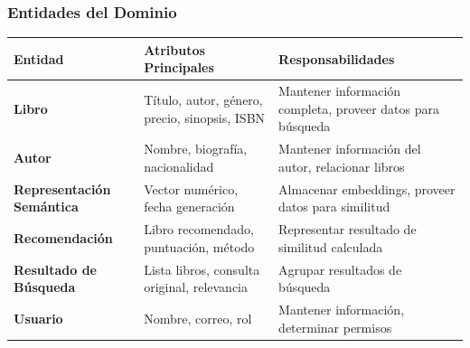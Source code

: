 \documentclass[aspectratio=169]{beamer}
\begin{document}
\begin{frame}
\frametitle{Entidades del Dominio}

\begin{table}
\centering
\tiny
\begin{tabular}{p{3cm}p{4cm}p{4cm}}
\toprule
\textbf{Entidad} & \textbf{Atributos Principales} & \textbf{Responsabilidades} \\
\midrule
\textbf{Libro} & Título, autor, género, precio, sinopsis, ISBN & Mantener información completa, proveer datos para búsqueda \\
\textbf{Autor} & Nombre, biografía, nacionalidad & Mantener información del autor, relacionar libros \\
\textbf{Representación Semántica} & Vector numérico, fecha generación & Almacenar embeddings, proveer datos para similitud \\
\textbf{Recomendación} & Libro recomendado, puntuación, método & Representar resultado de similitud calculada \\
\textbf{Resultado de Búsqueda} & Lista libros, consulta original, relevancia & Agrupar resultados de búsqueda \\
\textbf{Usuario} & Nombre, correo, rol & Mantener información, determinar permisos \\
\bottomrule
\end{tabular}
\end{table}

\end{frame}
\end{document}
